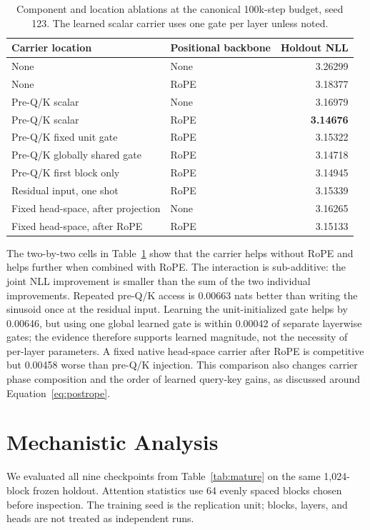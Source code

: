 \documentclass{article}
\begin{document}
\begin{table}[t]
\centering
\caption{Component and location ablations at the canonical 100k-step budget,
seed 123. The learned scalar carrier uses one gate per layer unless noted.}
\label{tab:components}
\begin{tabular}{llr}
\toprule
Carrier location & Positional backbone & Holdout NLL \\
\midrule
None & None & 3.26299 \\
None & RoPE & 3.18377 \\
Pre-Q/K scalar & None & 3.16979 \\
Pre-Q/K scalar & RoPE & \textbf{3.14676} \\
Pre-Q/K fixed unit gate & RoPE & 3.15322 \\
Pre-Q/K globally shared gate & RoPE & 3.14718 \\
Pre-Q/K first block only & RoPE & 3.14945 \\
Residual input, one shot & RoPE & 3.15339 \\
Fixed head-space, after projection & None & 3.16265 \\
Fixed head-space, after RoPE & RoPE & 3.15133 \\
\bottomrule
\end{tabular}
\end{table}

The two-by-two cells in Table~\ref{tab:components} show that the carrier helps
without RoPE and helps further when combined with RoPE. The interaction is
sub-additive: the joint NLL improvement is smaller than the sum of the two
individual improvements. Repeated pre-Q/K access is 0.00663 nats better than
writing the sinusoid once at the residual input. Learning the unit-initialized
gate helps by 0.00646, but using one global learned gate is within 0.00042 of
separate layerwise gates; the evidence therefore supports learned magnitude,
not the necessity of per-layer parameters. A fixed native head-space carrier
after RoPE is competitive but 0.00458 worse than pre-Q/K injection. This
comparison also changes carrier phase composition and the order of learned
query-key gains, as discussed around Equation~\ref{eq:postrope}.

\section{Mechanistic Analysis}
\label{sec:mechanism}

We evaluated all nine checkpoints from Table~\ref{tab:mature} on the same
1,024-block frozen holdout. Attention statistics use 64 evenly spaced blocks
chosen before inspection. The training seed is the replication unit; blocks,
layers, and heads are not treated as independent runs.
\end{document}
